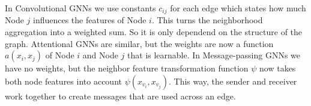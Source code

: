 In Convolutional GNNs we use constants $c_{ij}$ for each edge which states how much Node $j$ influences the features of Node $i$. This turns the neighborhood aggregation into a weighted sum. So it is only dependend on the structure of the graph. Attentional GNNs are similar, but the weights are now a function $a(x_i,x_j)$ of Node $i$ and Node $j$ that is learnable. In Message-passing GNNs we have no weights, but the neighbor feature transformation function $\psi$ now takes both node features into account $\psi(x_{v_i}, x_{v_j})$. This way, the sender and receiver work together to create messages that are used across an edge. \par


